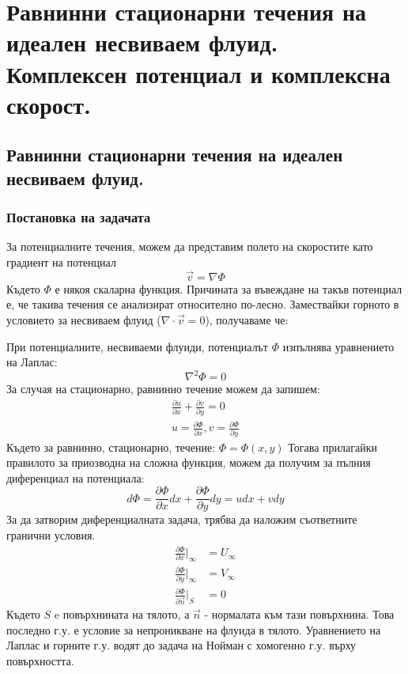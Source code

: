 \section{Равнинни стационарни течения на идеален несвиваем флуид. Комплексен потенциал и комплексна скорост.}
\subsection{Равнинни стационарни течения на идеален несвиваем флуид.}
\subsubsection{Постановка на задачата}
За потенциалните течения, можем да представим полето на скоростите като градиент на потенциал
\begin{equation*}
	\vec{v} = \nabla \Phi
\end{equation*}
Където $\Phi$ е някоя скаларна функция. Причината за въвеждане на такъв потенциал е, че такива течения се анализират относително по-лесно. Замествайки горното в условието за несвиваем флуид ($\nabla \cdot \vec{v} = 0$), получаваме че:

\noindent При потенциалните, несвиваеми флуиди, потенциалът $\Phi$ изпълнява уравнението на Лаплас:
\begin{equation*}
	\nabla^2 \Phi  = 0
\end{equation*}
За случая на стационарно, равнинно течение можем да запишем:
\begin{align}
	\label{eq:planar_flow}
	\frac{\partial u}{\partial x} + \frac{\partial v}{\partial y} = 0 \\
	u = \frac{\partial \Phi}{\partial x}, v = \frac{\partial \Phi}{\partial y}
\end{align}
Където за равнинно, стационарно, течение: $\Phi = \Phi(x,y)$
Тогава прилагайки правилото за приозводна на сложна функция, можем да получим за пълния диференциал на потенциала:
\begin{equation*}
	d \Phi = \frac{\partial \Phi}{\partial x} d x +  \frac{\partial \Phi}{\partial y} dy = u dx + v dy
\end{equation*}
За да затворим диференциалната задача, трябва да наложим съответните гранични условия.
\begin{align*}
	\frac{\partial \Phi}{\partial x} \Bigg|_{\infty}  & = U_{\infty} \\
	\frac{\partial \Phi}{\partial y} \Bigg|_{\infty}  & = V_{\infty} \\
	\frac{\partial \Phi}{\partial \vec{n}} \Bigg|_{S} & = 0
\end{align*}
Където $S$ e повърхнината на тялото, а $\vec{n}$ - нормалата към тази повърхнина. Това последно г.у. е условие за непроникване на
флуида в тялото.
Уравнението на Лаплас и горните г.у. водят до задача на Нойман с хомогенно г.у. върху повърхността.
